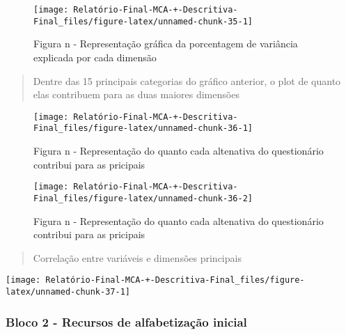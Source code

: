 \documentclass[
]{article}
\begin{document}
\begin{figure}

{\centering \texttt{[image: Relatório-Final-MCA-+-Descritiva-Final\_files/figure-latex/unnamed-chunk-35-1]} 

}

\caption{Figura n - Representação gráfica da porcentagem de variância explicada por cada dimensão}\label{fig:unnamed-chunk-35}
\end{figure}

\begin{quote}
Dentre das 15 principais categorias do gráfico anterior, o plot de
quanto elas contribuem para as duas maiores dimensões
\end{quote}

\begin{figure}

{\centering \texttt{[image: Relatório-Final-MCA-+-Descritiva-Final\_files/figure-latex/unnamed-chunk-36-1]} 

}

\caption{Figura n - Representação do quanto cada altenativa do questionário contribui para as pricipais}\label{fig:unnamed-chunk-36-1}
\end{figure}
\begin{figure}

{\centering \texttt{[image: Relatório-Final-MCA-+-Descritiva-Final\_files/figure-latex/unnamed-chunk-36-2]} 

}

\caption{Figura n - Representação do quanto cada altenativa do questionário contribui para as pricipais}\label{fig:unnamed-chunk-36-2}
\end{figure}

\begin{quote}
Correlação entre variáveis e dimensões principais
\end{quote}

\begin{center}\texttt{[image: Relatório-Final-MCA-+-Descritiva-Final\_files/figure-latex/unnamed-chunk-37-1]} \end{center}

\hypertarget{bloco-2---recursos-de-alfabetizauxe7uxe3o-inicial}{%
\subsubsection{\texorpdfstring{\textbf{Bloco 2 - Recursos de
alfabetização
inicial}}{Bloco 2 - Recursos de alfabetização inicial}}\label{bloco-2---recursos-de-alfabetizauxe7uxe3o-inicial}}
\end{document}
